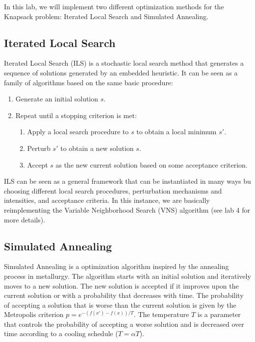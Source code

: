 In this lab, we will implement two different optimization methods for the Knapsack problem: Iterated Local Search and Simulated Annealing.
\subsection{Iterated Local Search}
Iterated Local Search (ILS) is a stochastic local search method that generates a sequence of solutions generated by an embedded heuristic. It can be seen as a family of algorithms based on the same basic procedure:
\begin{enumerate}
    \item Generate an initial solution $s$.
    \item Repeat until a stopping criterion is met:
          \begin{enumerate}
              \item Apply a local search procedure to $s$ to obtain a local minimum $s'$.
              \item Perturb $s'$ to obtain a new solution $s$.
              \item Accept $s$ as the new current solution based on some acceptance criterion.
          \end{enumerate}
\end{enumerate}
ILS can be seen as a general framework that can be instantiated in many ways bu choosing different local search procedures, perturbation mechanisms and intensities, and acceptance criteria. In this instance, we are basically reimplementing the Variable Neighborhood Search (VNS) algorithm (see lab 4 for more details).


\subsection{Simulated Annealing}
Simulated Annealing is a optimization algorithm inspired by the annealing process in metallurgy. The algorithm starts with an initial solution and iteratively moves to a new solution. The new solution is accepted if it improves upon the current solution or with a probability that decreases with time. The probability of accepting a solution that is worse than the current solution is given by the Metropolis criterion $p = e^{-(f(x')-f(x))/T}$. The temperature $T$ is a parameter that controls the probability of accepting a worse solution and is decreased over time according to a cooling schedule ($T = \alpha T$).

